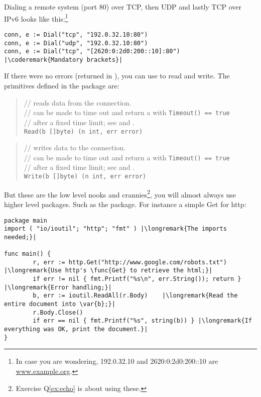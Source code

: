 Dialing a remote system (port 80) over TCP, then UDP and lastly TCP over IPv6 looks
like this:\footnote{In case
you are wondering, 192.0.32.10 and 2620:0:2d0:200::10 are \url{www.example.org}.}
\begin{lstlisting}
conn, e := Dial("tcp", "192.0.32.10:80")
conn, e := Dial("udp", "192.0.32.10:80")
conn, e := Dial("tcp", "[2620:0:2d0:200::10]:80") |\coderemark{Mandatory brackets}|
\end{lstlisting}

If there were no errors (returned in ), you can use  to read and write.
The primitives defined in the package  are:
\begin{quote}
//  reads data from the connection.\\
//  can be made to time out and return a  with \lstinline{Timeout() == true}\\
// after a fixed time limit; see  and .\\
\lstinline{Read(b []byte) (n int, err error)}
\end{quote}

\begin{quote}
//  writes data to the connection.\\
//  can be made to time out and return a  with \lstinline{Timeout() == true}\\
// after a fixed time limit; see  and .\\
\lstinline{Write(b []byte) (n int, err error)}
\end{quote}

But these are the low level nooks and crannies\footnote{Exercise Q\ref{ex:echo} is about using
these.}, you will almost always use higher level packages.
Such as the  package. For instance a simple Get for http:
\begin{lstlisting}
package main
import ( "io/ioutil"; "http"; "fmt" ) |\longremark{The imports needed;}|

func main() {
        r, err := http.Get("http://www.google.com/robots.txt") |\longremark{Use http's \func{Get} to retrieve the html;}|
        if err != nil { fmt.Printf("%s\n", err.String()); return } |\longremark{Error handling;}|
        b, err := ioutil.ReadAll(r.Body)    |\longremark{Read the entire document into \var{b};}|
        r.Body.Close()  
        if err == nil { fmt.Printf("%s", string(b)) } |\longremark{If everything was OK, print the document.}|
}
\end{lstlisting}
\showremarks

